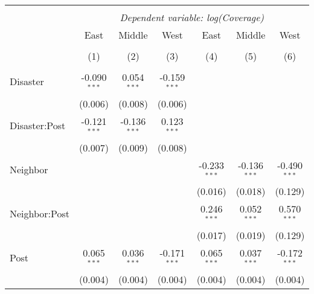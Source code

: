 
\begin{tabular}{@{\extracolsep{5pt}}lcccccc}
\\[-1.8ex]\hline
\hline \\[-1.8ex]
& \multicolumn{6}{c}{\textit{Dependent variable: log(Coverage)}} \
\cr \cline{2-7}
\\[-1.8ex] & \multicolumn{1}{c}{East} & \multicolumn{1}{c}{Middle} & \multicolumn{1}{c}{West} & \multicolumn{1}{c}{East} & \multicolumn{1}{c}{Middle} & \multicolumn{1}{c}{West}  \\
\\[-1.8ex] & (1) & (2) & (3) & (4) & (5) & (6) \\
\hline \\[-1.8ex]
 Disaster & -0.090$^{***}$ & 0.054$^{***}$ & -0.159$^{***}$ & & & \\
& (0.006) & (0.008) & (0.006) & & & \\
 Disaster:Post & -0.121$^{***}$ & -0.136$^{***}$ & 0.123$^{***}$ & & & \\
& (0.007) & (0.009) & (0.008) & & & \\
 Neighbor & & & & -0.233$^{***}$ & -0.136$^{***}$ & -0.490$^{***}$ \\
& & & & (0.016) & (0.018) & (0.129) \\
 Neighbor:Post & & & & 0.246$^{***}$ & 0.052$^{***}$ & 0.570$^{***}$ \\
& & & & (0.017) & (0.019) & (0.129) \\
 Post & 0.065$^{***}$ & 0.036$^{***}$ & -0.171$^{***}$ & 0.065$^{***}$ & 0.037$^{***}$ & -0.172$^{***}$ \\
& (0.004) & (0.004) & (0.004) & (0.004) & (0.004) & (0.004) \\

\end{tabular}
